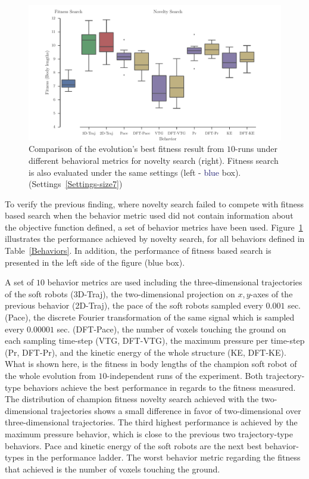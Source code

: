 \begin{figure}[t!]
\centering
\includegraphics[width=1.0\textwidth]{../Figures/Results/BehaviorsPerformance.pdf}
\caption{Comparison of the evolution's best fitness result from $10$-runs under different behavioral metrics for novelty search (right). Fitness search is also evaluated under the same settings (left - \textcolor{MidnightBlue}{blue} box). (Settings~\ref{Settings-size7})}
\label{fig:BehaviorsPerformance}
\end{figure}

To verify the previous finding, where novelty search failed to compete with fitness based search when the behavior metric used did not contain information about the objective function defined, a set of behavior metrics have been used. Figure~\ref{fig:BehaviorsPerformance} illustrates the performance achieved by novelty search, for all behaviors defined in Table~\ref{Behaviors}. In addition, the performance of fitness based search is presented in the left side of the figure (\textcolor{NavyBlue}{blue} box).

A set of $10$ behavior metrics are used including the three-dimensional trajectories of the soft robots (3D-Traj), the two-dimensional projection on $x,y$-axes of the previous behavior (2D-Traj), the pace of the soft robots sampled every $0.001$ sec. (Pace), the discrete Fourier transformation of the same signal which is sampled every $0.00001$ sec. (DFT-Pace), the number of voxels touching the ground on each sampling time-step (VTG, DFT-VTG), the maximum pressure per time-step (Pr, DFT-Pr), and the kinetic energy of the whole structure (KE, DFT-KE). What is shown here, is the fitness in body lengths of the champion soft robot of the whole evolution from $10$-independent runs of the experiment. Both trajectory-type behaviors achieve the best performance in regards to the fitness measured. The distribution of champion fitness novelty search achieved with the two-dimensional trajectories shows a small difference in favor of two-dimensional over three-dimensional trajectories. The third highest performance is achieved by the maximum pressure behavior, which is close to the previous two trajectory-type behaviors. Pace and kinetic energy of the soft robots are the next best behavior-types in the performance ladder. The worst behavior metric regarding the fitness that achieved is the number of voxels touching the ground.

